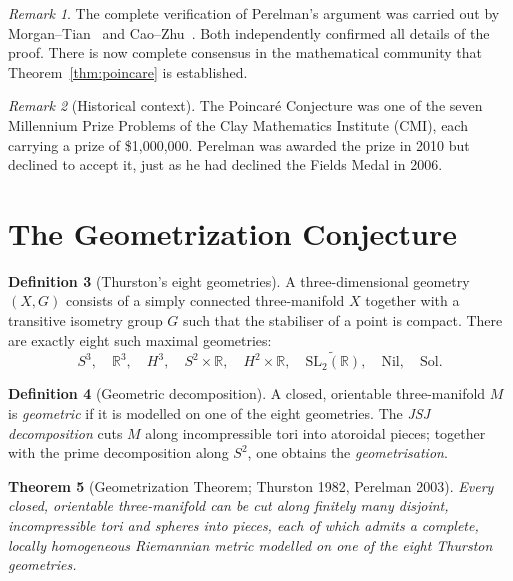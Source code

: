 \documentclass[12pt,a4paper]{amsart}
\newtheorem{theorem}{Theorem}[section]
\theoremstyle{definition}
\newtheorem{definition}[theorem]{Definition}
\theoremstyle{remark}
\newtheorem{remark}[theorem]{Remark}
\newcommand{\R}{\mathbb{R}}
\begin{document}
\begin{remark}
The complete verification of Perelman's argument was carried out by
Morgan--Tian~\cite{MorganTian2007} and Cao--Zhu~\cite{CaoZhu2006}.  Both
independently confirmed all details of the proof.  There is now complete
consensus in the mathematical community that Theorem~\ref{thm:poincare} is
established.
\end{remark}

\begin{remark}[Historical context]
The Poincar\'{e} Conjecture was one of the seven Millennium Prize Problems
of the Clay Mathematics Institute (CMI), each carrying a prize of
\$1{,}000{,}000.  Perelman was awarded the prize in 2010 but declined to
accept it, just as he had declined the Fields Medal in 2006.
\end{remark}


\section{The Geometrization Conjecture}
\label{sec:geom}

\begin{definition}[Thurston's eight geometries]
\label{def:geom}
A three-dimensional geometry $(X,G)$ consists of a simply connected
three-manifold $X$ together with a transitive isometry group $G$ such that
the stabiliser of a point is compact.  There are exactly eight such maximal
geometries:
\[
  S^3,\quad \R^3,\quad H^3,\quad S^2\times\R,\quad H^2\times\R,\quad
  \widetilde{\mathrm{SL}_2(\R)},\quad \mathrm{Nil},\quad \mathrm{Sol}.
\]
\end{definition}

\begin{definition}[Geometric decomposition]
A closed, orientable three-manifold $M$ is \emph{geometric} if it is modelled
on one of the eight geometries.  The \emph{JSJ decomposition} cuts $M$ along
incompressible tori into atoroidal pieces; together with the prime
decomposition along $S^2$, one obtains the \emph{geometrisation}.
\end{definition}

\begin{theorem}[Geometrization Theorem; Thurston 1982, Perelman 2003]
\label{thm:geom}
Every closed, orientable three-manifold can be cut along finitely many
disjoint, incompressible tori and spheres into pieces, each of which
admits a complete, locally homogeneous Riemannian metric modelled on one of
the eight Thurston geometries.
\end{theorem}
\end{document}

